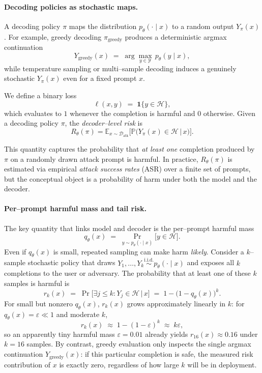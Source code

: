 \paragraph{Decoding policies as stochastic maps.}
A decoding policy $\pi$ maps the distribution $p_\theta(\cdot \mid x)$
to a random output $Y_\pi(x)$.
For example, greedy decoding $\pi_{\text{greedy}}$ produces a
deterministic argmax continuation
\[
  Y_{\text{greedy}}(x)
  \;=\;
  \arg\max_{y \in \mathcal{Y}} \, p_\theta(y \mid x),
\]
while temperature sampling or multi–sample decoding induces a genuinely
stochastic $Y_\pi(x)$ even for a fixed prompt $x$.

We define a binary loss
\[
  \ell(x,y)
  \;=\;
  \mathbf{1}\{y \in \mathcal{H}\},
\]
which evaluates to $1$ whenever the completion is harmful and $0$
otherwise.
Given a decoding policy $\pi$, the \emph{decoder–level risk} is
\[
  R_\theta(\pi)
  =
  \mathbb{E}_{x \sim \mathcal{D}_{\text{atk}}}
  \Big[ \mathbb{P}\big( Y_\pi(x) \in \mathcal{H} \,\big|\, x \big) \Big].
\]

This quantity captures the probability that \emph{at least one}
completion produced by $\pi$ on a randomly drawn attack prompt is
harmful.
In practice, $R_\theta(\pi)$ is estimated via empirical
\emph{attack success rates} (ASR) over a finite set of prompts, but the
conceptual object is a probability of harm under both the model and the
decoder.

\paragraph{Per–prompt harmful mass and tail risk.}
The key quantity that links model and decoder is the per–prompt harmful
mass
\[
  q_\theta(x)
  \;=\;
  \Pr_{y \sim p_\theta(\cdot \mid x)} \big[ y \in \mathcal{H} \big].
\]
Even if $q_\theta(x)$ is small, repeated sampling can make harm
\emph{likely}.
Consider a $k$–sample stochastic policy that draws
$Y_1,\dots,Y_k \overset{\text{i.i.d.}}{\sim} p_\theta(\cdot \mid x)$
and exposes all $k$ completions to the user or adversary.
The probability that at least one of these $k$ samples is harmful is
\[
  r_k(x)
  \;=\;
  \Pr\big[ \exists j \leq k : Y_j \in \mathcal{H} \,\big|\, x \big]
  \;=\;
  1 - \big(1 - q_\theta(x)\big)^k.
\]
For small but nonzero $q_\theta(x)$, $r_k(x)$ grows approximately
linearly in $k$:
for $q_\theta(x) = \varepsilon \ll 1$ and moderate $k$,
\[
  r_k(x)
  \;\approx\;
  1 - (1 - \varepsilon)^k
  \;\approx\;
  k \varepsilon,
\]
so an apparently tiny harmful mass $\varepsilon = 0.01$ already yields
$r_{16}(x) \approx 0.16$ under $k{=}16$ samples.
By contrast, greedy evaluation only inspects the single argmax
continuation $Y_{\text{greedy}}(x)$: if this particular completion is
safe, the measured risk contribution of $x$ is exactly zero, regardless
of how large $k$ will be in deployment.

